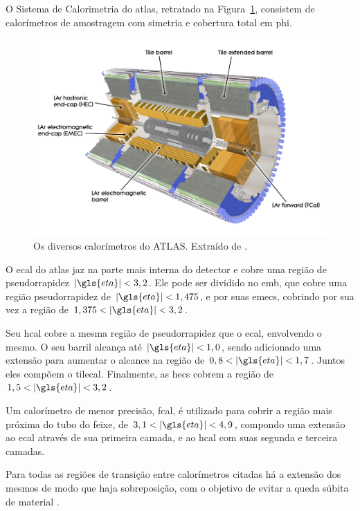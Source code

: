 O Sistema de Calorimetria \cite{cal_tdr,ecal_tdr,hcal_tdr} do \gls{atlas}, retratado na
Figura~\ref{fig:cal_atlas}, consistem de calorímetros de amostragem com 
simetria e cobertura total em \gls{phi}.

\begin{figure}[h!t]
\centering
\includegraphics[width=\textwidth]{imagens/calorimetros.pdf}
\caption[Os diversos subsistemas de calorimetria do ATLAS]{
Os diversos calorímetros do ATLAS. Extraído de
\cite{atlas_calorimeter_photo}.}
\label{fig:cal_atlas}
\end{figure}

O \gls{ecal} do \gls{atlas} jaz na parte mais interna do detector e cobre uma região de 
pseudorrapidez $|\gls{eta}|<3,2$. Ele pode ser dividido no
\gls{emb}, que cobre uma região pseudorrapidez de $|\gls{eta}|<1,475$, 
e por suas \glspl{emec}, cobrindo por sua vez a região de $1,375<|\gls{eta}|<3,2$.

Seu \gls{hcal} cobre a mesma região de pseudorrapidez que o \gls{ecal}, envolvendo
o mesmo. O seu barril alcança até $|\gls{eta}|<1,0$, sendo adicionado uma
extensão para aumentar o alcance na região de $0,8<|\gls{eta}|<1,7$. Juntos eles
compõem o \gls{tilecal}. Finalmente, as \glspl{hec} cobrem a região de $1,5<|\gls{eta}|<3,2$. 

Um calorímetro de menor precisão, \gls{fcal}, 
é utilizado para cobrir a região mais próxima do tubo do feixe, de
$3,1<|\gls{eta}|<4,9$, compondo uma extensão ao \gls{ecal} através de sua primeira camada,  
e ao \gls{hcal} com suas segunda e terceira camadas. 

Para todas as regiões de transição entre calorímetros citadas 
há a extensão dos mesmos de modo que haja sobreposição, 
com o objetivo de evitar a queda súbita de material \cite{paper_atlas}. 

